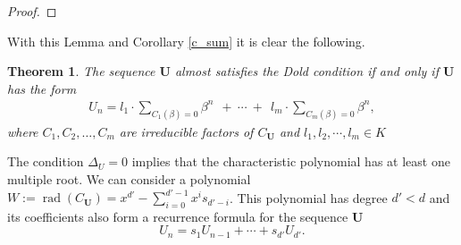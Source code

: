 \documentclass[preprint,12pt]{elsarticle}
\newcommand{\pp}{\mathfrak{p} }
\DeclareMathOperator{\rad}{rad}
\newtheorem{theorem}{Theorem}
\begin{document}
\begin{proof}

\end{proof}



With this Lemma and Corollary \ref{c_sum} it is clear the following.
\begin{theorem}\label{the_any}
    The sequence ${\mathbf U}$ almost satisfies the Dold condition if and only if ${\mathbf U}$ has the form %
    \begin{align}\label{eq_general_form_2}
        U_n = l_1\cdot\sum_{C_1(\beta)=0} \beta^n   \ \ +\ \cdots\ + \ \
        l_m\cdot\sum_{C_m(\beta)=0} \beta^n ,   
    \end{align}
    where $C_1, C_2, \ldots, C_m$ are irreducible factors of $C_{\mathbf U}$ and $l_1, l_2, \cdots, l_m \in K$
\end{theorem}


The condition $\Delta_U=0$ implies that the characteristic polynomial has at least one multiple root. We can consider a polynomial $W := \rad(C_\mathbf{U}) = x^{d'} - \sum_{i=0}^{d'-1}x^is_{d'-i}$. This polynomial has degree $d'< d$ and its coefficients also form a recurrence formula for the sequence $\mathbf{U}$ 
$$ {U}_n = s_{1}{U}_{n-1} + \cdots + s_{d'}{U}_{d'}.
$$
\end{document}
